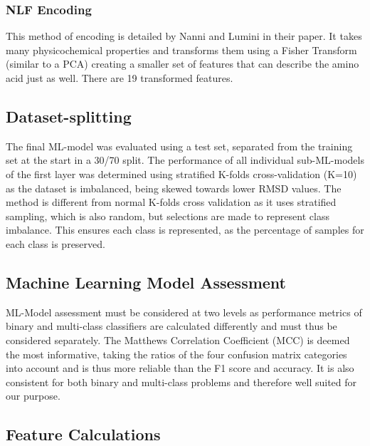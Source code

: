 \documentclass[12pt]{article}
\begin{document}
\subsubsection{NLF Encoding}
This method of encoding is detailed by Nanni and Lumini in their paper. It takes many physicochemical properties and transforms them using a Fisher Transform (similar to a PCA) creating a smaller set of features that can describe the amino acid just as well. There are 19 transformed features. 

\subsection{Dataset-splitting}
The final ML-model was evaluated using a test set, separated from the
training set at the start in a 30/70 split. The performance of all individual sub-ML-models of the first layer was determined using stratified K-folds cross-validation (K=10) as the
dataset is imbalanced, being skewed towards lower RMSD values\cite{Krstajic2014,Kohavi1995}. The
method is different from normal K-folds cross validation as it uses
stratified sampling, which is also random, but selections are made to represent class imbalance.
This ensures each class is represented, as the percentage of samples for each class is
preserved.

\subsection{Machine Learning Model Assessment} 
ML-Model assessment must be considered at two levels as performance
metrics of binary and multi-class classifiers are calculated
differently and must thus be considered separately. The Matthews
Correlation Coefficient (MCC)\cite{Chicco2020} is deemed the most
informative, taking the ratios of the four confusion matrix categories
into account and is thus more reliable than the F1 score and
accuracy. It is also consistent for both binary and multi-class
problems and therefore well suited for our purpose.\cite{Jurman2012}
 
\subsection{Feature Calculations}
\end{document}
